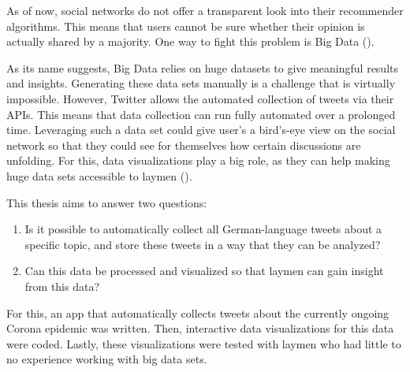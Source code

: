 As of now, social networks do not offer a transparent look into their recommender algorithms. This means that users cannot be sure whether their opinion is actually shared by a majority. One way to fight this problem is Big Data (\cite{crawfordCriticalQuestionsBig2012}).

As its name suggests, Big Data relies on huge datasets to give meaningful results and insights. Generating these data sets manually is a challenge that is virtually impossible. However, Twitter allows the automated collection of tweets via their APIs. This means that data collection can run fully automated over a prolonged time. Leveraging such a data set could give user's a bird's-eye view on the social network so that they could see for themselves how certain discussions are unfolding. For this, data visualizations play a big role, as they can help making huge data sets accessible to laymen (\cite{donalekImmersiveCollaborativeData2014}).

This thesis aims to answer two questions:

\begin{enumerate}
    \item Is it possible to automatically collect all German-language tweets about a specific topic, and store these tweets in a way that they can be analyzed?
    \item Can this data be processed and visualized so that laymen can gain insight from this data?
\end{enumerate}

For this, an app that automatically collects tweets about the currently ongoing Corona epidemic was written. Then, interactive data visualizations for this data were coded. Lastly, these visualizations were tested with laymen who had little to no experience working with big data sets.

